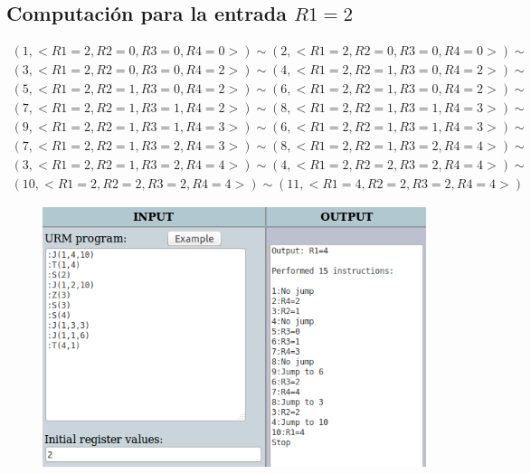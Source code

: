 		\subsection{Computación para la entrada $R1=2$}
		\begin{equation*}\begin{gathered}
		(1, <R1=2, R2=0, R3=0, R4=0>) \sim (2, <R1=2, R2=0, R3=0, R4=0>) \sim\\
		(3, <R1=2, R2=0, R3=0, R4=2>) \sim (4, <R1=2, R2=1, R3=0, R4=2>) \sim\\
		(5, <R1=2, R2=1, R3=0, R4=2>) \sim (6, <R1=2, R2=1, R3=0, R4=2>) \sim\\
		(7, <R1=2, R2=1, R3=1, R4=2>) \sim (8, <R1=2, R2=1, R3=1, R4=3>) \sim\\ 
		(9, <R1=2, R2=1, R3=1, R4=3>) \sim (6, <R1=2, R2=1, R3=1, R4=3>) \sim\\
		(7, <R1=2, R2=1, R3=2, R4=3>) \sim (8, <R1=2, R2=1, R3=2, R4=4>) \sim\\
		(3, <R1=2, R2=1, R3=2, R4=4>) \sim (4, <R1=2, R2=2, R3=2, R4=4>) \sim\\
		(10, <R1=2, R2=2, R3=2, R4=4>) \sim (11, <R1=4, R2=2, R3=2, R4=4>)
		\end{gathered}\end{equation*}
		\begin{figure}[H]
  			\centering
  			\includegraphics[scale=0.5]{images/42.png}
  		\end{figure}
